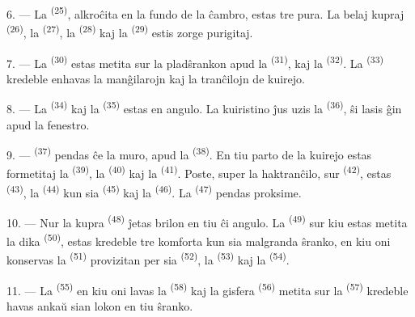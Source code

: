 \VUsaut{4.0mm}
\VUsaut{3.0mm}

6. --- La  \textsuperscript{(25)}, alkroĉita en la fundo de
la ĉambro, estas tre pura. La belaj kupraj 
\textsuperscript{(26)}, la  \textsuperscript{(27)}, la
 \textsuperscript{(28)} kaj la 
\textsuperscript{(29)} estis zorge purigitaj.

7. --- La  \textsuperscript{(30)} estas metita sur la
pladŝrankon apud la  \textsuperscript{(31)}, kaj la
 \textsuperscript{(32)}. La 
\textsuperscript{(33)} kredeble enhavas la manĝilarojn kaj la tranĉilojn de
kuirejo.

8. --- La  \textsuperscript{(34)} kaj la 
\textsuperscript{(35)} estas en angulo. La kuiristino ĵus uzis la
 \textsuperscript{(36)}, ŝi lasis ĝin apud la fenestro.

9. ---  \textsuperscript{(37)} pendas ĉe la muro, apud la
 \textsuperscript{(38)}. En tiu parto de la kuirejo estas
formetitaj la  \textsuperscript{(39)}, la
 \textsuperscript{(40)} kaj la 
\textsuperscript{(41)}. Poste, super la haktranĉilo, sur 
\textsuperscript{(42)}, estas  \textsuperscript{(43)}, la
 \textsuperscript{(44)} kun sia 
\textsuperscript{(45)} kaj la  \textsuperscript{(46)}. La
 \textsuperscript{(47)} pendas proksime.

10. --- Nur la kupra  \textsuperscript{(48)} ĵetas brilon en tiu
ĉi angulo. La  \textsuperscript{(49)} sur kiu estas metita la
dika  \textsuperscript{(50)}, estas kredeble tre komforta kun
sia malgranda ŝranko, en kiu oni konservas la 
\textsuperscript{(51)} provizitan per sia 
\textsuperscript{(52)}, la  \textsuperscript{(53)} kaj la
 \textsuperscript{(54)}.

\VUsaut{4.0mm}
\VUsaut{3.0mm}

11. --- La  \textsuperscript{(55)} en kiu oni lavas la
 \textsuperscript{(58)} kaj la gisfera 
\textsuperscript{(56)} metita sur la 
\textsuperscript{(57)} kredeble havas ankaŭ sian lokon en tiu ŝranko.

